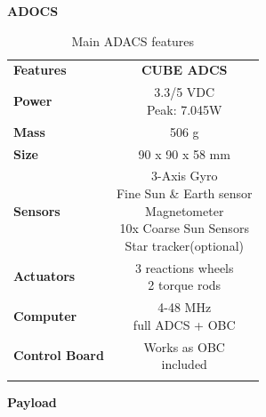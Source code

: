 \textbf{ADOCS}
\begin{longtable}{| l | c |}
	
	\hline
	\rowcolor[gray]{0.60} \multicolumn{2}{|c|}{\textbf{ADACS}} \\
	\hline
	
	\hline
	\rowcolor[gray]{0.75}	\textbf{Features} &  \textbf{CUBE ADCS} \\
	\hline
	
	\cellcolor[gray]{0.85} \textbf{Power} &\makecell{3.3/5 VDC\\ Peak: 7.045W }  \\ 	\hline
	\cellcolor[gray]{0.85} \textbf{Mass} & 506 g\\ \hline
	\cellcolor[gray]{0.85} \textbf{Size} & 90 x 90 x 58 mm \\ \hline
	\cellcolor[gray]{0.85} \textbf{Sensors} & \makecell{3-Axis Gyro\\Fine Sun \& Earth sensor \\ Magnetometer\\10x Coarse Sun Sensors \\Star tracker(optional)}\\ 	\hline
	\cellcolor[gray]{0.85} \textbf{Actuators} &  \makecell{3 reactions wheels\\2 torque rods}\\ 	\hline
	\cellcolor[gray]{0.85} \textbf{Computer} &\makecell{4-48 MHz\\ full ADCS + OBC}   \\ \hline
	\cellcolor[gray]{0.85} \textbf{Control Board} & \makecell{Works as OBC\\included}\\
	\hline
	
	\caption{Main ADACS features}
	\label{ADACS}
	
\end{longtable}
\textbf{Payload}
